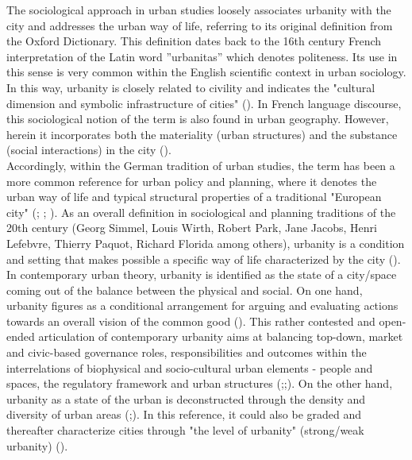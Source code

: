 \documentclass[11pt]{report}
\begin{document}
{{{The sociological approach in urban studies loosely associates urbanity with the city and addresses the urban way of life, referring to its original definition from the Oxford Dictionary. This definition dates back to the 16th century French interpretation of the Latin word ”urbanitas” which denotes politeness. Its use in this sense is very common within the English scientific context in urban sociology. In this way, urbanity is closely related to civility and indicates the "cultural dimension and symbolic infrastructure of cities" (\href{Zijderveld}{\citealt{zijderveld_theory_2011}}).
In French language discourse, this sociological notion of the term is also found in urban geography. However, herein it incorporates both the materiality (urban structures) and the substance (social interactions) in the city (\citealt{bisson_urbanity:_2016}). 
\\

Accordingly, within the German tradition of urban studies, the term has been a more common reference for urban policy and planning, where it denotes the urban way of life and typical structural properties of a traditional "European city" (\href{Prigge}{\citealt{Prigge_urbanitaet_1996}}; \href{wust}{\citealt{wust_urbanity_2005}}; \href{Lossau}{\citealt{lossau_new_2008}}). 
As an overall definition in sociological and planning traditions of the 20th century (Georg Simmel, Louis Wirth, Robert Park, Jane Jacobs, Henri Lefebvre, Thierry Paquot, Richard Florida among others), urbanity is a condition and setting that makes possible a specific way of life characterized by the city (\href{levy}{\citealt{levy_liens_2013}}). 
\\

In contemporary urban theory, urbanity is identified as the state of a city/space coming out of the balance  between the physical and social. On one hand, urbanity figures  as a conditional arrangement for arguing and evaluating actions towards an overall vision of the common good (\href{Holden}{\citealt{holden_justifying_2015}}).
This rather contested and open-ended articulation of contemporary urbanity aims at balancing top-down, market and civic-based governance roles, responsibilities and outcomes within the interrelations of biophysical and socio-cultural urban elements - people and spaces, the regulatory framework and urban structures (\href{Groth}{\citealt{groth_reclaiming_2005}};\href{Tardin}{\citealt{tardin_landscape_2014}};\href{Holden}{\citealt{holden_justifying_2015}}).
On the other hand, urbanity as a state of the urban is deconstructed through the density and diversity of urban areas (\href{Levy}{\citealt{levy_mesure_1997}};\href{Levy}{\citealt{levy_liens_2013}}). In this reference, it could also be graded and thereafter characterize cities through  "the level of urbanity" (strong/weak urbanity) (\citealt{levy_liens_2013}).
\\

}}}
\end{document}
